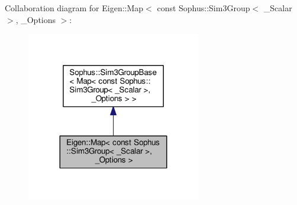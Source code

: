Collaboration diagram for Eigen\+:\+:Map$<$ const Sophus\+:\+:Sim3\+Group$<$ \+\_\+\+Scalar $>$, \+\_\+\+Options $>$\+:
\nopagebreak
\begin{figure}[H]
\begin{center}
\leavevmode
\includegraphics[width=215pt]{class_eigen_1_1_map_3_01const_01_sophus_1_1_sim3_group_3_01___scalar_01_4_00_01___options_01_4__coll__graph}
\end{center}
\end{figure}
